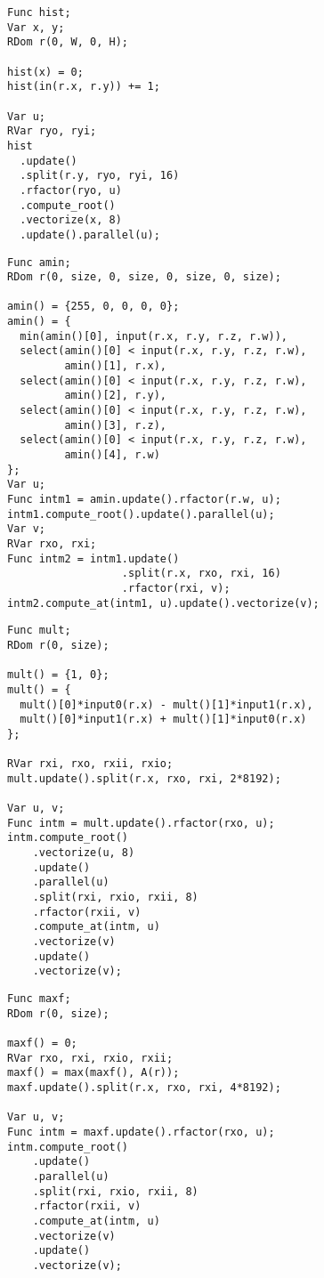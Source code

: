 \begin{lstlisting}[caption={Benchmark code for histogram of a two-dimensional image.}, label={lst:benchmark_histogram}]
Func hist;
Var x, y;
RDom r(0, W, 0, H);

hist(x) = 0;
hist(in(r.x, r.y)) += 1;

Var u;
RVar ryo, ryi;
hist
  .update()
  .split(r.y, ryo, ryi, 16)
  .rfactor(ryo, u)
  .compute_root()
  .vectorize(x, 8)
  .update().parallel(u);
\end{lstlisting}

\begin{lstlisting}[caption={Benchmark code for argmin over 4D array}, label={lst:benchmark_argmin}]
Func amin;
RDom r(0, size, 0, size, 0, size, 0, size);

amin() = {255, 0, 0, 0, 0};
amin() = {
  min(amin()[0], input(r.x, r.y, r.z, r.w)),
  select(amin()[0] < input(r.x, r.y, r.z, r.w), 
         amin()[1], r.x),
  select(amin()[0] < input(r.x, r.y, r.z, r.w), 
         amin()[2], r.y),
  select(amin()[0] < input(r.x, r.y, r.z, r.w), 
         amin()[3], r.z),
  select(amin()[0] < input(r.x, r.y, r.z, r.w), 
         amin()[4], r.w)
};
Var u;
Func intm1 = amin.update().rfactor(r.w, u);
intm1.compute_root().update().parallel(u);
Var v;
RVar rxo, rxi;
Func intm2 = intm1.update()
                  .split(r.x, rxo, rxi, 16)
                  .rfactor(rxi, v);
intm2.compute_at(intm1, u).update().vectorize(v);                   
\end{lstlisting}

\begin{lstlisting}[caption={Benchmark code for complex product}, label={lst:benchmark_complex_multiply}]
Func mult;
RDom r(0, size);

mult() = {1, 0};
mult() = {
  mult()[0]*input0(r.x) - mult()[1]*input1(r.x),
  mult()[0]*input1(r.x) + mult()[1]*input0(r.x)
};

RVar rxi, rxo, rxii, rxio;
mult.update().split(r.x, rxo, rxi, 2*8192);

Var u, v;
Func intm = mult.update().rfactor(rxo, u);
intm.compute_root()
    .vectorize(u, 8)
    .update()
    .parallel(u)
    .split(rxi, rxio, rxii, 8)
    .rfactor(rxii, v)
    .compute_at(intm, u)
    .vectorize(v)
    .update()
    .vectorize(v);
\end{lstlisting}

\begin{lstlisting}[caption={Benchmark code for finding the maximum value over 1D array}, label={lst:benchmark_max}]
Func maxf;
RDom r(0, size);

maxf() = 0;
RVar rxo, rxi, rxio, rxii;
maxf() = max(maxf(), A(r));
maxf.update().split(r.x, rxo, rxi, 4*8192);

Var u, v;
Func intm = maxf.update().rfactor(rxo, u);
intm.compute_root()
    .update()
    .parallel(u)
    .split(rxi, rxio, rxii, 8)
    .rfactor(rxii, v)
    .compute_at(intm, u)
    .vectorize(v)
    .update()
    .vectorize(v);
\end{lstlisting}

